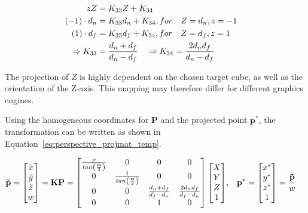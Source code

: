 \begin{equation}
    \begin{aligned}
        zZ &= K_{33} Z + K_{34} &\\
        (-1)\cdot d_n &= K_{33} d_n + K_{34} \hfill, for \quad Z = d_n, z = -1 \\
        (1) \cdot d_f &= K_{33} d_f + K_{34} \hfill, for \quad Z = d_f, z = 1 \\
        \Rightarrow K_{33} &= \frac{d_n+d_f}{d_n-d_f} \quad \Rightarrow K_{34} = \frac{2d_n d_f}{d_n-d_f}
    \end{aligned}
    \label{eq:perspective_zeqs}
\end{equation}

The projection of $Z$ is highly dependent on the chosen target cube, as well as the orientation of the Z-axis. This mapping may therefore differ for different graphics engines. 

Using the homogeneous coordinates for $\mathbf{P}$ and the projected point $\mathbf{p}^*$, the transformation can be written as shown in Equation~\eqref{eq:perspective_projmat_temp}.

\begin{equation}
    \begin{aligned}
        \mathbf{\Tilde{p}} = \begin{bmatrix}
            \Tilde{x} \\ \Tilde{y} \\ \Tilde{z} \\ w
        \end{bmatrix} = \mathbf{K}\mathbf{P} = \begin{bmatrix}
            \frac{\rho}{tan\left(\frac{\Theta}{2}\right)}& 0 & 0 & 0 \\
            0 & \frac{1}{tan\left(\frac{\Theta}{2}\right)}& 0 & 0 \\
            0 & 0 & \frac{d_n+d_f}{d_f-d_n} & \frac{2d_n d_f}{d_f-d_n} \\
            0 & 0 & 1 & 0
        \end{bmatrix} \begin{bmatrix}
            X \\ Y \\ Z \\ 1
        \end{bmatrix}
        &,& & \mathbf{p^*} = \begin{bmatrix}
            x^* \\ y^* \\ z^* \\ 1
        \end{bmatrix} = 
        \frac{\mathbf{\Tilde{p}}}{w}
    \end{aligned}
    \label{eq:perspective_projmat_temp}
\end{equation}

